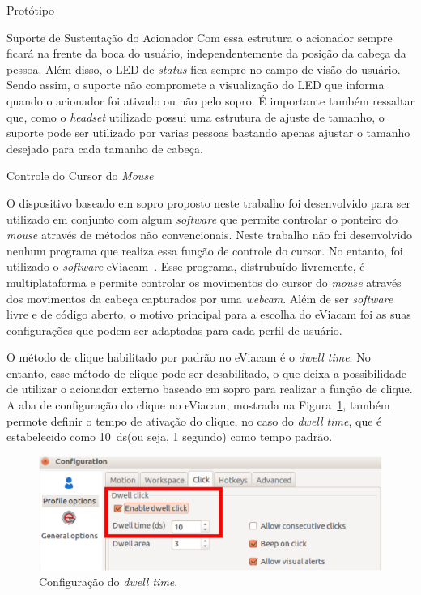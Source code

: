 \begin{chapter}{Protótipo}
\begin{section}{Suporte de Sustentação do Acionador}
Com essa estrutura o acionador sempre ficará na frente da boca do usuário,
independentemente da posição da cabeça da pessoa. Além disso, o LED de
\textit{status} fica sempre no campo de visão do usuário. Sendo assim, o suporte
não compromete a visualização do LED que informa quando o acionador foi ativado
ou não pelo sopro. É importante também ressaltar que, como o \textit{headset}
utilizado possui uma estrutura de ajuste de tamanho, o suporte pode ser
utilizado por varias pessoas bastando apenas ajustar o tamanho desejado para
cada tamanho de cabeça. 

\end{section}

\begin{section}{Controle do Cursor do \textit{Mouse}}

O dispositivo baseado em sopro proposto neste trabalho foi desenvolvido para ser
utilizado em conjunto com algum \textit{software} que permite controlar o
ponteiro do \textit{mouse} através de métodos não convencionais. Neste trabalho
não foi desenvolvido nenhum programa que realiza essa função de controle do
cursor. No entanto, foi utilizado o \textit{software} eViacam~\cite{eviacam}.
Esse programa, distrubuído livremente, é multiplataforma e permite controlar os
movimentos do cursor do \textit{mouse} através dos movimentos da cabeça
capturados por uma \textit{webcam}. Além de ser \textit{software} livre e de
código aberto, o motivo principal para a escolha do eViacam foi as suas
configurações que podem ser adaptadas para cada perfil de usuário.

O método de clique habilitado por padrão no eViacam é o \textit{dwell time}. No
entanto, esse método de clique pode ser desabilitado, o que deixa a
possibilidade de utilizar o acionador externo baseado em sopro para realizar a
função de clique. A aba de configuração do clique no eViacam, mostrada na
Figura~\ref{fig:click}, também permote definir o tempo de ativação do clique, no
caso do \textit{dwell time}, que é estabelecido como 10~ds(ou seja, 1 segundo)
como tempo padrão. 

\begin{figure}[!h]
	\centering
	\begin{minipage}[c]{\textwidth}
	\centering
	\includegraphics[width=0.7\linewidth]{fig/eviacamclick}
	\caption{Configuração do \textit{dwell time}.}
	\label{fig:click}
	\end{minipage}
\end{figure}
 

\end{section}
\end{chapter}
